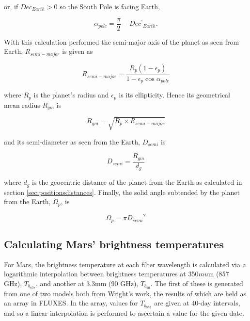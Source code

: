 \documentclass[11pt,twoside]{article}
\newcommand{\xlabel}[1]{}
\renewcommand{\_}{\texttt{\symbol{95}}}
\begin{document}
or, if $Dec_{Earth} > 0$ so the South Pole is facing Earth,

\begin{displaymath}
\alpha_{pole} =  \frac{\pi}{2} - {Dec^\prime}_{Earth}.
\end{displaymath}

With this calculation performed the semi-major axis of the planet as seen from Earth, $R_{semi-major}$ is given as

\begin{displaymath}
R_{semi-major} = \frac{R_{p} (1 - \epsilon_p)}{1 - \epsilon_p \cos \alpha_{pole}}
\end {displaymath}

where $R_p$ is the planet's radius and $\epsilon_p$ is its ellipticity.  Hence its geometrical mean radius $R_{gm}$ is

\begin{displaymath}
R_{gm} = \sqrt{R_p \times R_{semi-major}}
\end{displaymath}

and its semi-diameter as seen from the Earth, $D_{semi}$ is

\begin{displaymath}
D_{semi} = \frac{R_{gm}}{d_g}
\end{displaymath}

where $d_g$ is the geocentric distance of the planet from the Earth as calculated in section \ref{sec:positionsdistances}.  Finally, the solid angle subtended by the planet from the Earth, $\Omega_p$, is

\begin{displaymath}
\Omega_p = \pi {D_{semi}}^2
\end{displaymath}

\subsection{Calculating Mars' brightness temperatures}
\xlabel{marsbright}
\label{sec:marsbright}

For Mars, the brightness temperature at each filter wavelength is calculated via a logarithmic interpolation between brightness temperatures at 350$mu$m (857 GHz), $T_{b_{857}}$, and another at 3.3mm (90 GHz), $T_{b_{90}}$.  The first of these is generated from one of two models both from Wright's work, the results of which are held as an array in FLUXES.  In the array, values for $T_{b_{857}}$ are given at 40-day intervals, and so a linear interpolation is performed to ascertain a value for the given date.
\end{document}
